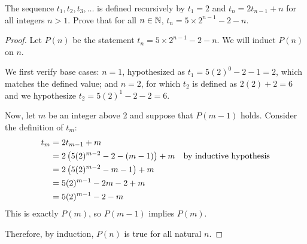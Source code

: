 \documentclass{agony}
\begin{document}
\question The sequence $t_1, t_2, t_3, \dots$ is defined recursively by
$t_1=2$ and $t_n = 2t_{n-1}+n$ for all integers $n > 1$.
Prove that for all $n\in\mathbb{N}$, $t_n = 5 \times 2^{n-1} - 2 - n$.
\begin{proof}
  Let $P(n)$ be the statement $t_n = 5 \times 2^{n-1} - 2 - n$.
  We will induct $P(n)$ on $n$.

  We first verify base cases: $n = 1$, hypothesized as $t_1 = 5(2)^0-2-1 = 2$, which matches the defined value;
  and $n=2$, for which $t_2$ is defined as $2(2)+2 = 6$ and we hypothesize $t_2 = 5(2)^{1}-2-2 = 6$.

  Now, let $m$ be an integer above 2 and suppose that $P(m-1)$ holds.
  Consider the definition of $t_m$:
  \begin{align*}
    t_m & = 2t_{m-1}+m                                   \\
        & = 2\left( 5(2)^{m-2} - 2 - (m-1) \right)+m & \text{by inductive hypothesis} \\
        & = 2\left( 5(2)^{m-2} - m - 1 \right)+m         \\
        & = 5(2)^{m-1} - 2m - 2 + m                      \\
        & = 5(2)^{m-1} - 2 - m
  \end{align*}
  This is exactly $P(m)$, so $P(m-1)$ implies $P(m)$.

  Therefore, by induction, $P(n)$ is true for all natural $n$.
\end{proof}
\end{document}
